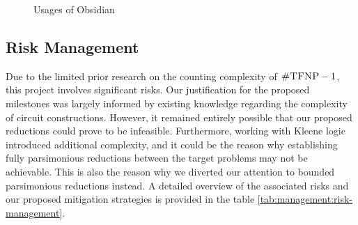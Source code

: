 \begin{figure}[h!]
    \centering
    \caption{Usages of Obsidian}
    \label{fig:theory:obsidian-usages}
\end{figure}



\subsection{Risk Management}

Due to the limited prior research on the counting complexity of $\textsc{\#TFNP} -1$,
this project involves significant risks.
Our justification for the proposed milestones was largely informed by existing knowledge regarding the complexity of circuit constructions.
However, it remained entirely possible that our proposed reductions could prove to be infeasible.
Furthermore, working with Kleene logic introduced additional complexity, and it could be the reason why 
establishing fully parsimonious reductions between the target problems may not be achievable.
This is also the reason why we diverted our attention to bounded parsimonious reductions instead.
A detailed overview of the associated risks and our proposed mitigation strategies is provided in the table \ref{tab:management:risk-management}.


